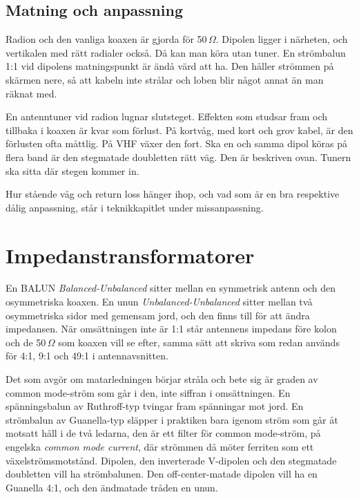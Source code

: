 \subsection{Matning och anpassning}

Radion och den vanliga koaxen är gjorda för 50\,$\Omega$. Dipolen
ligger i närheten, och vertikalen med rätt radialer också. Då kan man
köra utan tuner. En strömbalun 1:1 vid dipolens matningspunkt är ändå
värd att ha. Den håller strömmen på skärmen nere, så att kabeln inte
strålar och loben blir något annat än man räknat med.

En antenntuner vid radion lugnar slutsteget. Effekten som studsar fram
och tillbaka i koaxen är kvar som förlust. På kortvåg, med kort och
grov kabel, är den förlusten ofta måttlig. På VHF växer den fort. Ska
en och samma dipol köras på flera band är den stegmatade doubletten
rätt väg.  Den är beskriven ovan. Tunern ska sitta där stegen kommer
in.

Hur stående våg och return loss hänger ihop, och vad som är en bra
respektive dålig anpassning, står i teknikkapitlet under
missanpassning.






\section{Impedanstransformatorer}
\label{sec:baluner}

En BALUN {\it Balanced-Unbalanced} sitter mellan en symmetrisk antenn
och den osymmetriska koaxen. En unun {\it Unbalanced-Unbalanced}
sitter mellan två osymmetriska sidor med gemensam jord, och den finns
till för att ändra impedansen. När omsättningen inte är 1:1 står
antennens impedans före kolon och de 50\,$\Omega$ som koaxen vill se
efter, samma sätt att skriva som redan används för 4:1, 9:1 och 49:1 i
antennavsnitten.

Det som avgör om matarledningen börjar stråla och bete sig är graden
av common mode-ström som går i den, inte siffran i omsättningen. En
spänningsbalun av Ruthroff-typ tvingar fram spänningar mot jord. En
strömbalun av Guanella-typ släpper i praktiken bara igenom ström som
går åt motsatt håll i de två ledarna, den är ett filter för common
mode-ström, på engelska \textit{common mode current}, där strömmen då
möter ferriten som ett växelströmsmotstånd. Dipolen, den inverterade
V-dipolen och den stegmatade doubletten vill ha strömbalunen. Den
off-center-matade dipolen vill ha en Guanella 4:1, och den ändmatade
tråden en unun.

